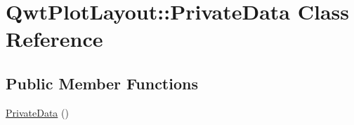\hypertarget{class_qwt_plot_layout_1_1_private_data}{\section{Qwt\-Plot\-Layout\-:\-:Private\-Data Class Reference}
\label{class_qwt_plot_layout_1_1_private_data}
}
\subsection*{Public Member Functions}
\begin{DoxyCompactItemize}
\item 
\hyperlink{class_qwt_plot_layout_1_1_private_data_ac00417dab275ab087481abd63212cce7}{Private\-Data} ()
\end{DoxyCompactItemize}
